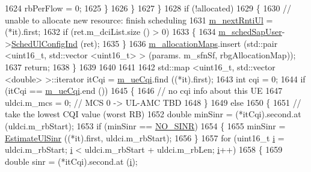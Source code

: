 \begin{DoxyCode}
1624                   rbPerFlow = 0;                 
1625                 \}
1626             \}
1627         \}
1628       \textcolor{keywordflow}{if} (!allocated)
1629         \{
1630           \textcolor{comment}{// unable to allocate new resource: finish scheduling}
1631           \hyperlink{classns3_1_1FdMtFfMacScheduler_ae8ab0aba539cbc8f37e1f593353063e0}{m\_nextRntiUl} = (*it).first;
1632           \textcolor{keywordflow}{if} (ret.m\_dciList.size () > 0)
1633             \{
1634               \hyperlink{classns3_1_1FdMtFfMacScheduler_ac856cbc41e5ac4e78562686fd29ba873}{m\_schedSapUser}->\hyperlink{classns3_1_1FfMacSchedSapUser_a1b89636256701a84d990db7db8aea874}{SchedUlConfigInd} (ret);
1635             \}
1636           \hyperlink{classns3_1_1FdMtFfMacScheduler_a95332c7dd2b82f65f37ee9bff70558e6}{m\_allocationMaps}.insert (std::pair <uint16\_t, std::vector <uint16\_t> > (params.
      m\_sfnSf, rbgAllocationMap));
1637           \textcolor{keywordflow}{return};
1638         \}
1639 
1640 
1641 
1642       std::map <uint16\_t, std::vector <double> >::iterator itCqi = \hyperlink{classns3_1_1FdMtFfMacScheduler_a5111c284868ab2a71c868fff681dbc0b}{m\_ueCqi}.find ((*it).first);
1643       \textcolor{keywordtype}{int} cqi = 0;
1644       \textcolor{keywordflow}{if} (itCqi == \hyperlink{classns3_1_1FdMtFfMacScheduler_a5111c284868ab2a71c868fff681dbc0b}{m\_ueCqi}.end ())
1645         \{
1646           \textcolor{comment}{// no cqi info about this UE}
1647           uldci.m\_mcs = 0; \textcolor{comment}{// MCS 0 -> UL-AMC TBD}
1648         \}
1649       \textcolor{keywordflow}{else}
1650         \{
1651           \textcolor{comment}{// take the lowest CQI value (worst RB)}
1652           \textcolor{keywordtype}{double} minSinr = (*itCqi).second.at (uldci.m\_rbStart);
1653           \textcolor{keywordflow}{if} (minSinr == \hyperlink{cqa-ff-mac-scheduler_8h_a520d71777be043568160c783a9c65fd5}{NO\_SINR})
1654             \{
1655               minSinr = \hyperlink{classns3_1_1FdMtFfMacScheduler_a122203c0bde6e999628485d24dee6e5e}{EstimateUlSinr} ((*it).first, uldci.m\_rbStart);
1656             \}
1657           \textcolor{keywordflow}{for} (uint16\_t \hyperlink{bernuolliDistribution_8m_a6f6ccfcf58b31cb6412107d9d5281426}{i} = uldci.m\_rbStart; \hyperlink{bernuolliDistribution_8m_a6f6ccfcf58b31cb6412107d9d5281426}{i} < uldci.m\_rbStart + uldci.m\_rbLen; 
      \hyperlink{bernuolliDistribution_8m_a6f6ccfcf58b31cb6412107d9d5281426}{i}++)
1658             \{
1659               \textcolor{keywordtype}{double} sinr = (*itCqi).second.at (\hyperlink{bernuolliDistribution_8m_a6f6ccfcf58b31cb6412107d9d5281426}{i});

\end{DoxyCode}
